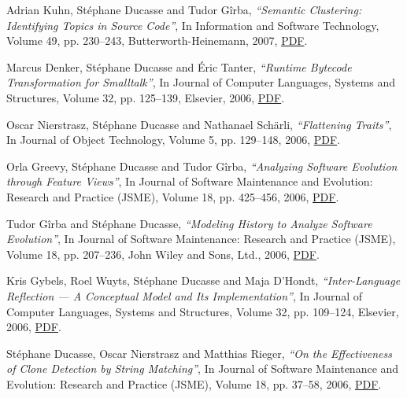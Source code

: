 \documentclass{article}
\newcommand{\czauthors}[1]{#1}
\newcommand{\cztitle}[1]{\emph{``#1''}}
\newcommand{\czjournal}[1]{#1}
\begin{document}
\begin{itemize}
	\pub  \czauthors{Adrian Kuhn, St\'ephane Ducasse and Tudor G\^irba},  \cztitle{Semantic Clustering: Identifying Topics in Source Code},  In \czjournal{Information and Software Technology}, Volume 49, pp. 230--243, Butterworth-Heinemann, 2007, \href{http://scg.unibe.ch/archive/drafts/Kuhn06bSemanticClustering.pdf}{PDF}.

	\pub  \czauthors{Marcus Denker, St\'ephane Ducasse and {\'E}ric Tanter},  \cztitle{Runtime Bytecode Transformation for {Smalltalk}},  In \czjournal{Journal of Computer Languages, Systems and Structures}, Volume 32, pp. 125--139, Elsevier, 2006, \href{http://rmod-files.lille.inria.fr/Team/Texts/Papers/Denk06a-COMLAN-RuntimeByteCode.pdf}{PDF}.

	\pub  \czauthors{Oscar Nierstrasz, St\'ephane Ducasse and Nathanael Sch\"arli},  \cztitle{Flattening {Traits}},  In \czjournal{Journal of Object Technology}, Volume 5, pp. 129--148, 2006, \href{http://rmod-files.lille.inria.fr/Team/Texts/Papers/Nier06aFlatteningTraits.pdf}{PDF}.

	\pub  \czauthors{Orla Greevy, St\'ephane Ducasse and Tudor G\^irba},  \cztitle{Analyzing Software Evolution through Feature Views},  In \czjournal{Journal of Software Maintenance and Evolution: Research and Practice (JSME)}, Volume 18, pp. 425--456, 2006, \href{http://rmod-files.lille.inria.fr/Team/Texts/Papers/Gree06bTraceScraperJSME-SCG.pdf}{PDF}.

	\pub  \czauthors{Tudor G\^irba and St\'ephane Ducasse},  \cztitle{Modeling History to Analyze Software Evolution},  In \czjournal{Journal of Software Maintenance: Research and Practice (JSME)}, Volume 18, pp. 207--236, John Wiley and Sons, Ltd., 2006, \href{http://rmod-files.lille.inria.fr/Team/Texts/Papers/Girb06aHismo.pdf}{PDF}.

	\pub  \czauthors{Kris Gybels, Roel Wuyts, St\'ephane Ducasse and Maja D'Hondt},  \cztitle{Inter-Language Reflection --- A Conceptual Model and Its Implementation},  In \czjournal{Journal of Computer Languages, Systems and Structures}, Volume 32, pp. 109--124, Elsevier, 2006, \href{http://rmod-files.lille.inria.fr/Team/Texts/Papers/Gybe06aSymbioticReflectionESUGJournal.pdf}{PDF}.

	\pub  \czauthors{St\'ephane Ducasse, Oscar Nierstrasz and Matthias Rieger},  \cztitle{On the Effectiveness of Clone Detection by String Matching},  In \czjournal{Journal of Software Maintenance and Evolution: Research and Practice (JSME)}, Volume 18, pp. 37--58, 2006, \href{http://rmod-files.lille.inria.fr/Team/Texts/Papers/Duca06iDuplocJSMEPaper.pdf}{PDF}.


\end{itemize}
\end{document}
